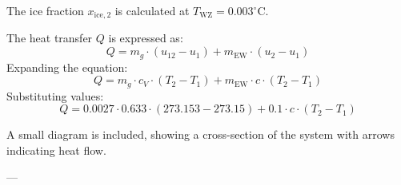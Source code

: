 The ice fraction \( x_{\text{ice},2} \) is calculated at \( T_{\text{WZ}} = 0.003^\circ \text{C} \).  

The heat transfer \( Q \) is expressed as:  
\[
Q = m_g \cdot (u_{12} - u_{1}) + m_{\text{EW}} \cdot (u_{2} - u_{1})
\]  
Expanding the equation:  
\[
Q = m_g \cdot c_V \cdot (T_2 - T_1) + m_{\text{EW}} \cdot c \cdot (T_2 - T_1)
\]  
Substituting values:  
\[
Q = 0.0027 \cdot 0.633 \cdot (273.153 - 273.15) + 0.1 \cdot c \cdot (T_2 - T_1)
\]  

A small diagram is included, showing a cross-section of the system with arrows indicating heat flow.  

---
